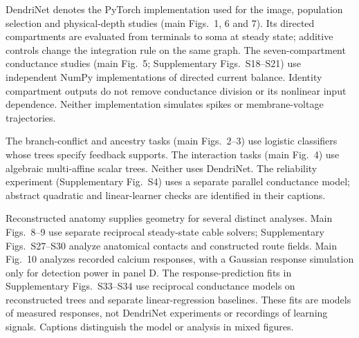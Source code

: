 DendriNet denotes the PyTorch implementation used for the image, population
selection and physical-depth studies (main Figs.~1, 6 and 7). Its directed
compartments are evaluated from terminals to soma at steady state; additive
controls change the integration rule on the same graph. The seven-compartment
conductance studies (main Fig.~5; Supplementary Figs.~S18--S21) use independent
NumPy implementations of directed current balance. Identity compartment
outputs do not remove conductance division or its nonlinear input dependence.
Neither implementation simulates spikes or membrane-voltage trajectories.

The branch-conflict and ancestry tasks (main Figs.~2--3) use logistic
classifiers whose trees specify feedback supports. The interaction tasks
(main Fig.~4) use algebraic multi-affine scalar trees. Neither uses DendriNet.
The reliability experiment (Supplementary Fig.~S4) uses a separate parallel
conductance model; abstract quadratic and linear-learner checks are identified
in their captions.

Reconstructed anatomy supplies geometry for several distinct analyses.
Main Figs.~8--9 use separate reciprocal steady-state cable solvers;
Supplementary Figs.~S27--S30 analyze anatomical contacts and constructed route
fields. Main Fig.~10 analyzes recorded calcium responses, with a Gaussian
response simulation only for detection power in panel D. The response-prediction
fits in Supplementary Figs.~S33--S34 use reciprocal conductance models on
reconstructed trees and separate linear-regression baselines. These fits are
models of measured responses, not DendriNet experiments or recordings of
learning signals. Captions distinguish the model or analysis in mixed figures.

